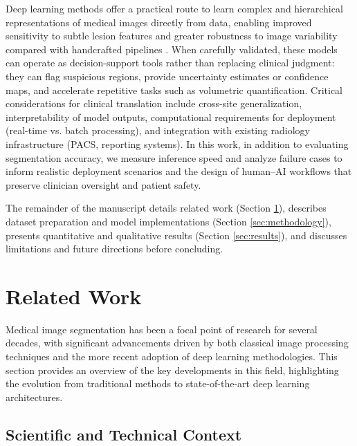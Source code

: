\documentclass[12pt]{article}
\begin{document}
Deep learning methods offer a practical route to learn complex and hierarchical representations of medical images directly from data, enabling improved sensitivity to subtle lesion features and greater robustness to image variability compared with handcrafted pipelines \cite{Liu2021,Isensee2021}. When carefully validated, these models can operate as decision-support tools rather than replacing clinical judgment: they can flag suspicious regions, provide uncertainty estimates or confidence maps, and accelerate repetitive tasks such as volumetric quantification. Critical considerations for clinical translation include cross-site generalization, interpretability of model outputs, computational requirements for deployment (real-time vs. batch processing), and integration with existing radiology infrastructure (PACS, reporting systems). In this work, in addition to evaluating segmentation accuracy, we measure inference speed and analyze failure cases to inform realistic deployment scenarios and the design of human–AI workflows that preserve clinician oversight and patient safety.

The remainder of the manuscript details related work (Section \ref{sec:relatedwork}), describes dataset preparation and model implementations (Section \ref{sec:methodology}), presents quantitative and qualitative results (Section \ref{sec:results}), and discusses limitations and future directions before concluding.

\section{Related Work} \label{sec:relatedwork}

Medical image segmentation has been a focal point of research for several decades, with significant advancements driven by both classical image processing techniques and the more recent adoption of deep learning methodologies. This section provides an overview of the key developments in this field, highlighting the evolution from traditional methods to state-of-the-art deep learning architectures.

\subsection{Scientific and Technical Context} \label{subsec:context}
\end{document}
